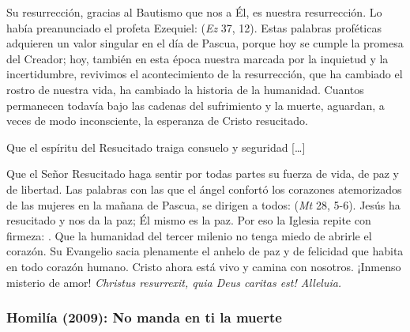 \begin{body}
Su resurrección, gracias al Bautismo que nos  a Él, es nuestra resurrección. Lo había preanunciado el profeta Ezequiel:  (\textit{Ez} 37, 12). Estas palabras proféticas adquieren un valor singular en el día de Pascua, porque hoy se cumple la promesa del Creador; hoy, también en esta época nuestra marcada por la inquietud y la incertidumbre, revivimos el acontecimiento de la resurrección, que ha cambiado el rostro de nuestra vida, ha cambiado la historia de la humanidad. Cuantos permanecen todavía bajo las cadenas del sufrimiento y la muerte, aguardan, a veces de modo inconsciente, la esperanza de Cristo resucitado. 

Que el espíritu del Resucitado traiga consuelo y seguridad [\ldots] 

Que el Señor Resucitado haga sentir por todas partes su fuerza de vida, de paz y de libertad. Las palabras con las que el ángel confortó los corazones atemorizados de las mujeres en la mañana de Pascua, se dirigen a todos:  (\textit{Mt} 28, 5-6). Jesús ha resucitado y nos da la paz; Él mismo es la paz. Por eso la Iglesia repite con firmeza: . Que la humanidad del tercer milenio no tenga miedo de abrirle el corazón. Su Evangelio sacia plenamente el anhelo de paz y de felicidad que habita en todo corazón humano. Cristo ahora está vivo y camina con nosotros. ¡Inmenso misterio de amor! \textit{Christus resurrexit, quia Deus caritas est! Alleluia.}
\end{body}


\newpage 


\subsubsection{Homilía (2009): No manda en ti la muerte}


